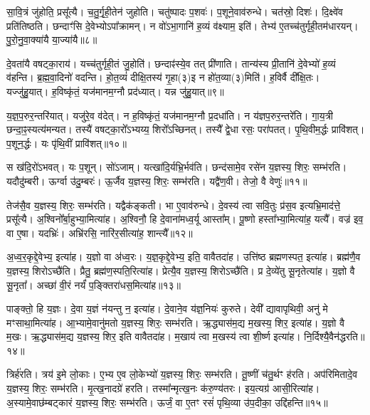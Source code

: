 सा॒वि॒त्रं जु॑होति॒ प्रसू᳚त्यै। 
च॒तु॒र्गृ॒ही॒तेन॑ जुहोति। 
चतु॑ष्पादः प॒शवः॑। 
प॒शूने॒वाव॑रुन्धे। 
चत॑स्रो॒ दिशः॑। 
दि॒क्ष्वे॑व प्रति॑तिष्ठति। 
छन्दाꣳ॑सि दे॒वेभ्योऽपा᳚क्रामन्। 
न वो॑ऽभा॒गानि॑ ह॒व्यं व॑क्ष्याम॒ इति॑। 
तेभ्य॑ ए॒तच्च॑तुर्गृही॒तम॑धारयन्। 
पु॒रो॒नु॒वा॒क्या॑यै या॒ज्या॑यै॥८॥

दे॒वता॑यै वषट्का॒राय॑। 
यच्च॑तुर्गृही॒तं जु॒होति॑। 
छन्दाꣴ॑स्ये॒व तत् प्री॑णाति। 
तान्य॑स्य प्री॒तानि॑ दे॒वेभ्यो॑ ह॒व्यं व॑हन्ति। 
ब्र॒ह्म॒वा॒दिनो॑ वदन्ति। 
हो॒त॒व्यं॑ दीक्षि॒तस्य॑ गृ॒हा(३)इ न हो॑त॒व्या(३)मिति॑। 
ह॒विर्\mbox{}वै दी᳚क्षि॒तः। 
यज्जु॑हु॒यात्। 
ह॒विष्कृ॑तं॒ यज॑मानम॒ग्नौ प्रद॑ध्यात्। 
यन्न जु॑हु॒यात्॥९॥

य॒ज्ञ॒प॒रुर॒न्तरि॑यात्। 
यजु॑रे॒व व॑देत्। 
न ह॒विष्कृ॑तं॒ यज॑मानम॒ग्नौ प्र॒दधा॑ति। 
न य॑ज्ञप॒रुर॒न्तरे॑ति। 
गा॒य॒त्री छन्दा॒ꣴ॒स्यत्य॑मन्यत। 
तस्यै॑ वषट्का॒रो᳚ऽभ्यय्य॒ शिरो᳚ऽच्छिनत्। 
तस्यै᳚ द्वे॒धा रसः॒ परा॑पतत्। 
पृ॒थि॒वीम॒र्द्धः प्रावि॑शत्। 
प॒शून॒र्द्धः। 
यः पृ॑थि॒वीं प्रावि॑शत्॥१०॥

स ख॑दि॒रो॑ऽभवत्। 
यः प॒शून्। 
सो॑ऽजाम्। 
यत्खा॑दि॒र्यभ्रि॒र्भ\-व॑ति। 
छन्द॑सामे॒व रसे॑न य॒ज्ञस्य॒ शिरः॒ सम्भ॑रति। 
यदौदु॑म्बरी। 
ऊर्ग्वा उ॑दु॒म्बरः॑। 
ऊ॒र्जैव य॒ज्ञस्य॒ शिरः॒ सम्भ॑रति। 
यद्वै॑ण॒वी। 
तेजो॒ वै वेणुः॑॥११॥

तेज॑सै॒व य॒ज्ञस्य॒ शिरः॒ सम्भ॑रति। 
यद्वैक॑ङ्कती। 
भा ए॒वाव॑रुन्धे। 
दे॒वस्य॑ त्वा सवि॒तुः प्र॑स॒व इत्यभ्रि॒माद॑त्ते॒ प्रसू᳚त्यै। 
अ॒श्विनो᳚र्बा॒हुभ्या॒\-मित्या॑ह। 
अ॒श्विनौ॒ हि दे॒वाना॑मध्व॒र्यू आस्ता᳚म्। 
पू॒ष्णो हस्ता᳚भ्या॒मित्या॑ह॒ यत्यै᳚। 
वज्र॑ इव॒ वा ए॒षा। 
यदभ्रिः॑। 
अभ्रि॑रसि॒ नारि॑र॒सीत्या॑ह॒ शान्त्यै᳚॥१२॥

अ॒ध्व॒र॒कृद्दे॒वेभ्य॒ इत्या॑ह। 
य॒ज्ञो वा अ॑ध्व॒रः। 
य॒ज्ञ॒कृद्दे॒वेभ्य॒ इति॒ वावैतदा॑ह। 
उत्ति॑ष्ठ ब्रह्मणस्पत॒ इत्या॑ह। 
ब्रह्म॑णै॒व य॒ज्ञस्य॒ शिरोऽच्छै॑ति। 
प्रैतु॒ ब्रह्म॑ण॒स्पति॒रित्या॑ह। 
प्रेत्यै॒व य॒ज्ञस्य॒ शिरोऽच्छै॑ति। 
प्र दे॒व्ये॑तु सू॒नृतेत्या॑ह। 
य॒ज्ञो वै सू॒नृता᳚। 
अच्छा॑ वी॒रं नर्यं॑ प॒ङ्क्तिरा॑धस॒मित्या॑ह॥१३॥

पाङ्क्तो॒ हि य॒ज्ञः। 
दे॒वा य॒ज्ञं न॑यन्तु न॒ इत्या॑ह। 
दे॒वाने॒व य॑ज्ञ॒नियः॑ कुरुते। 
देवी᳚ द्यावापृथिवी॒ अनु॑ मे मꣳसाथा॒मित्या॑ह। 
आ॒भ्यामे॒वानु॑मतो य॒ज्ञस्य॒ शिरः॒ सम्भ॑रति। 
ऋ॒द्ध्यास॑म॒द्य म॒खस्य॒ शिर॒ इत्या॑ह। 
य॒ज्ञो वै म॒खः। 
ऋ॒द्ध्यास॑म॒द्य य॒ज्ञस्य॒ शिर॒ इति वावैतदा॑ह। 
म॒खाय॑ त्वा म॒खस्य॑ त्वा शी॒र्ष्ण इत्या॑ह। 
नि॒र्दिश्यै॒वैन॑द्धरति॥१४॥

त्रिर्\mbox{}ह॑रति। 
त्रय॑ इ॒मे लो॒काः। 
ए॒भ्य ए॒व लो॒केभ्यो॑ य॒ज्ञस्य॒ शिरः॒ सम्भ॑रति। 
तू॒ष्णीं च॑तु॒र्थꣳ ह॑रति। 
अप॑रिमितादे॒व य॒ज्ञस्य॒ शिरः॒ सम्भ॑रति। 
मृ॒त्ख॒नादग्रे॑ हरति। 
तस्मा᳚न्मृत्ख॒नः क॑रु॒ण्य॑तरः। 
इय॒त्यग्र॑ आसी॒रित्या॑ह। 
अ॒स्यामे॒वाछ॑म्बट्कारं य॒ज्ञस्य॒ शिरः॒ सम्भ॑रति। 
ऊर्जं॒ वा ए॒तꣳ रसं॑ पृथि॒व्या उ॑प॒दीका॒ उद्दि॑हन्ति॥१५॥

